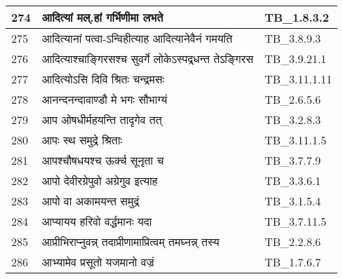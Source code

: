 \documentclass[17pt]{extarticle}
\begin{document}
\begin{longtable}{||p{0.4in}||p{4.9in}||p{0.9in}||}
    274 & आदित्यां मल्.हां गर्भिणीमा लभते & TB\_1.8.3.2       \\
    
    \hline
        
    275 & आदित्यानां पत्वा{-}ऽन्विहीत्याह आदित्यानेवैनं गमयति & TB\_3.8.9.3       \\
    
    \hline
        
    276 & आदित्याश्चाङ्गिरसश्च सुवर्गे लोकेऽस्पद्र्धन्त तेऽङ्गिरस & TB\_3.9.21.1       \\
    
    \hline
        
    277 & आदित्योऽसि दिवि श्रितः चन्द्रमसः & TB\_3.11.1.11       \\
    
    \hline
        
    278 & आनन्दनन्दावाण्डौ मे भगः सौभाग्यं & TB\_2.6.5.6       \\
    
    \hline
        
    279 & आप ओषधीर्महयन्ति तादृगेव तत् & TB\_3.2.8.3       \\
    
    \hline
        
    280 & आपः स्थ समुद्रे श्रिताः & TB\_3.11.1.5       \\
    
    \hline
        
    281 & आपश्चौषधयश्च ऊर्क्च सूनृता च & TB\_3.7.7.9       \\
    
    \hline
        
    282 & आपो देवीरग्रेपुवो अग्रेगुव इत्याह & TB\_3.3.6.1       \\
    
    \hline
        
    283 & आपो वा अकामयन्त समुद्रं & TB\_3.1.5.4       \\
    
    \hline
        
    284 & आप्यायय हरिवो वर्द्धमानः यदा & TB\_3.7.11.5       \\
    
    \hline
        
    285 & आप्रीभिराप्नुवन्न् तदाप्रीणामाप्रित्वम् तमघ्नन्न् तस्य & TB\_2.2.8.6       \\
    
    \hline
        
    286 & आभ्यामेव प्रसूतो यजमानो वज्रं & TB\_1.7.6.7       \\
    

\end{longtable}
\end{document}
